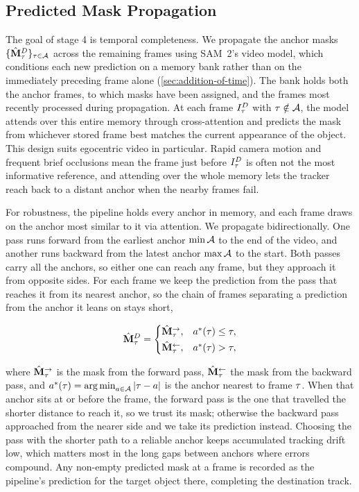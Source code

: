 \subsection{Predicted Mask Propagation}
\label{subsec:Stage4}

The goal of stage 4 is temporal completeness. We propagate the anchor masks $\{\hat{\mathbf{M}}^D_\tau\}_{\tau \in \mathcal{A}}$ across the remaining frames using SAM~2's video model, which conditions each new prediction on a memory bank rather than on the immediately preceding frame alone (\cref{sec:addition-of-time}). The bank holds both the anchor frames, to which masks have been assigned, and the frames most recently processed during propagation. At each frame $I^D_\tau$ with $\tau \notin \mathcal{A}$, the model attends over this entire memory through cross-attention and predicts the mask from whichever stored frame best matches the current appearance of the object. This design suits egocentric video in particular. Rapid camera motion and frequent brief occlusions mean the frame just before $I^D_\tau$ is often not the most informative reference, and attending over the whole memory lets the tracker reach back to a distant anchor when the nearby frames fail.

For robustness, the pipeline holds every anchor in memory, and each frame draws on the anchor most similar to it via attention. We propagate bidirectionally. One pass runs forward from the earliest anchor $\min \mathcal{A}$ to the end of the video, and another runs backward from the latest anchor $\max \mathcal{A}$ to the start. Both passes carry all the anchors, so either one can reach any frame, but they approach it from opposite sides. For each frame we keep the prediction from the pass that reaches it from its nearest anchor, so the chain of frames separating a prediction from the anchor it leans on stays short,

\begin{equation}
  \hat{\mathbf{M}}^D_\tau =
  \begin{cases}
    \hat{\mathbf{M}}^{\rightarrow}_\tau, & a^\ast(\tau) \leq \tau,\\[2pt]
    \hat{\mathbf{M}}^{\leftarrow}_\tau, & a^\ast(\tau) > \tau,
  \end{cases}
  \label{eq:mask-select}
\end{equation}

where $\hat{\mathbf{M}}^{\rightarrow}_\tau$ is the mask from the forward pass, $\hat{\mathbf{M}}^{\leftarrow}_\tau$ the mask from the backward pass, and $a^\ast(\tau) = \operatorname*{arg\,min}_{a \in \mathcal{A}} \left|\tau - a\right|$ is the anchor nearest to frame $\tau$. When that anchor sits at or before the frame, the forward pass is the one that travelled the shorter distance to reach it, so we trust its mask; otherwise the backward pass approached from the nearer side and we take its prediction instead. Choosing the pass with the shorter path to a reliable anchor keeps accumulated tracking drift low, which matters most in the long gaps between anchors where errors compound. Any non-empty predicted mask at a frame is recorded as the pipeline's prediction for the target object there, completing the destination track. 

